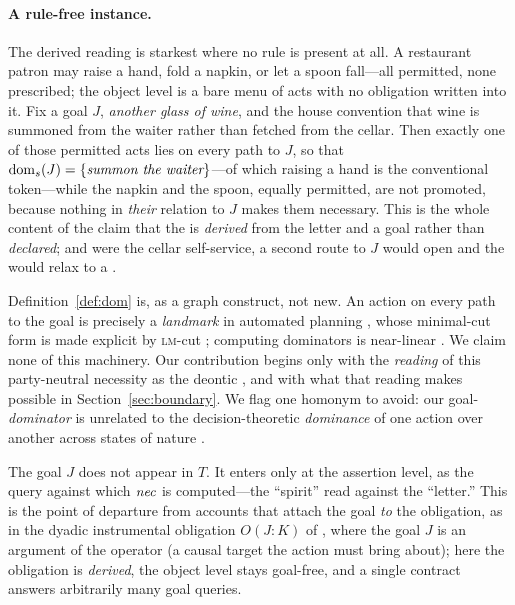 \paragraph{A rule-free instance.} The derived reading is starkest where no rule is present
at all. A restaurant patron may raise a hand, fold a napkin, or let a spoon fall---all
permitted, none prescribed; the object level is a bare menu of acts with no obligation
written into it. Fix a goal $J$, \emph{another glass of wine}, and the house convention that
wine is summoned from the waiter rather than fetched from the cellar. Then exactly one of
those permitted acts lies on every path to $J$, so that $\operatorname{dom}_s(J)=\{\textit{summon the
waiter}\}$---of which raising a hand is the conventional token---while the napkin and the
spoon, equally permitted, are not promoted, because nothing in \emph{their} relation to $J$
makes them necessary. This is the whole content of the claim that the \MUST{} is
\emph{derived} from the letter and a goal rather than \emph{declared}; and were the cellar
self-service, a second route to $J$ would open and the \MUST{} would relax to a \MAY{}.

\begin{remark}
\label{rem:landmarks}
Definition~\ref{def:dom} is, as a graph construct, not new. An action on every path to
the goal is precisely a \emph{landmark} in automated planning , whose minimal-cut form is made explicit by \textsc{lm}-cut
; computing dominators is near-linear
. We claim none of this machinery. Our contribution begins
only with the \emph{reading} of this party-neutral necessity as the deontic \MUST{}, and
with what that reading makes possible in Section~\ref{sec:boundary}. We flag one homonym
to avoid: our goal-\emph{dominator} is unrelated to the decision-theoretic
\emph{dominance} of one action over another across states of nature .
\end{remark}

\begin{remark}
The goal $J$ does not appear in $T$. It enters only at the assertion level, as the
query against which $\mathit{nec}$ is computed---the ``spirit'' read against the ``letter.''
This is the point of departure from accounts that attach the goal \emph{to} the
obligation, as in the dyadic instrumental obligation $O(J\!:\!K)$ of ,
where the goal $J$ is an argument of the operator (a causal target the action must bring
about); here the obligation is \emph{derived}, the object level stays goal-free, and a
single contract answers arbitrarily many goal queries.
\end{remark}

